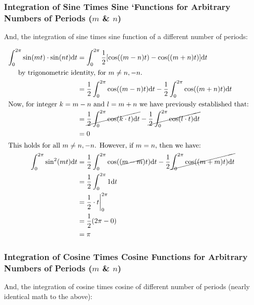 \documentclass[10pt]{article} %
\begin{document}
\subsubsection*{Integration of Sine Times Sine `Functions for Arbitrary Numbers of Periods ($m$ \& $n$)}


And, the integration of sine times sine function of a different number of periods:

\begin{align*}
    \int_0^{2\pi} \sin(mt) \cdot \sin(nt) \mathrm{d}t &= \int_0^{2\pi}\frac12[\cos((m-n)t) - \cos((m+n)t)]\mathrm{d}t \\
    \intertext{\hspace{0.5cm}by trigonometric identity, for $m \neq n, -n$.}
    & =\frac12\int_0^{2\pi}\cos((m-n)t)\mathrm{d}t - \frac12\int_0^{2\pi}\cos((m+n)t)\mathrm{d}t\\
    \intertext{Now, for integer $k=m-n$ and $l=m+n$ we have previously established that:}
    & =\cancel{\frac12\int_0^{2\pi}\cos(k \cdot t)\mathrm{d}t} - \cancel{\frac12\int_0^{2\pi}\cos(l \cdot t)\mathrm{d}t}\\
    & = 0 \\
    \intertext{This holds for all $m \neq n, -n$. However, if $m = n$, then we have:}
    \int_0^{2\pi} \sin^2(mt)\mathrm{d}t & = \frac12\int_0^{2\pi}\cos((\cancel{m-m})t)\mathrm{d}t - \frac12\cancel{\int_0^{2\pi}\cos((m+m)t)\mathrm{d}t}\\
    & = \frac12\int_0^{2\pi}1\mathrm{d}t\\
    & = \frac12 \cdot t \bigg\rvert_0^{2\pi} \\
    & = \frac12 (2\pi - 0) \\
    & = \pi
\end{align*}

\subsubsection*{Integration of Cosine Times Cosine Functions for Arbitrary Numbers of Periods ($m$ \& $n$)}


And, the integration of cosine times cosine of different number of periods (nearly identical math to the above):
\end{document}

